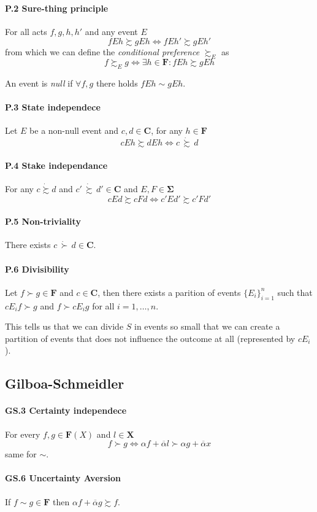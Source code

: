 \documentclass[landscape, 12pt]{extarticle}
\begin{document}
\begin{multicols}{2}
	\paragraph{P.2 Sure-thing principle}
	For all acts $f, g, h, h'$ and any event $E$
	\[
		fEh \succsim gEh \iff fEh' \succsim gEh'
	\]
	from which we can define the \textit{conditional preference} $\succsim_E$ as
	\[
		f \succsim_E g \iff \exists h \in \bm F : f E h \succsim gEh
	\]

	An event is \textit{null} if $\forall f, g$ there holds $fEh \sim gEh$.

	\paragraph{P.3 State independece}
	Let $E$ be a non-null event and $c, d \in \bm C$, for any $h \in \bm F$
	\[
		cEh \succsim dEh \iff c\, \dot \succsim \, d
	\]

	\paragraph{P.4 Stake independance}
	For any $c \dot \succsim d$ and $c' \, \dot \succsim \, d' \in \bm C$
	and $E, F \in \bm \Sigma$
	\[
		cEd \succsim cFd \iff c'Ed'\succsim c'Fd'
	\]

	\paragraph{P.5 Non-triviality}
	There exists $c \, \dot \succ \, d \in \bm C$.

	\paragraph{P.6 Divisibility}
	Let $f \succ g \in \bm F$ and $c \in \bm C$,
	then there exists a parition of events $\{E_i\}^n_{i=1}$
	such that $cE_if \succ g$ and $f \succ cE_ig$ for all $i=1,\dots,n$.

	This tells us that we can divide $S$ in events so small that we can create
	a partition of events that does not influence the outcome at all (represented by $cE_i$).

	\subsection{Gilboa-Schmeidler}
	\paragraph{GS.3 Certainty independece}
	For every $f, g \in \bm F(X)$ and $l \in \bm X$
	\[
		f \succ g \iff \alpha f + \overline \alpha l \succ \alpha g + \overline \alpha x
	\]
	same for $\sim$.

	\paragraph{GS.6 Uncertainty Aversion}
	If $f \sim g \in \bm F$ then $\alpha f + \overline \alpha g \succsim f$.

\end{multicols}
\end{document}
